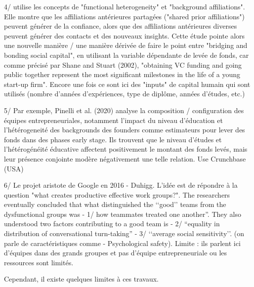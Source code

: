 \documentclass[12pt]{article}
\begin{document}
4/ \citep{beckman2007early} utilise les concepts de "functional heterogeneity" et "background affiliations". Elle montre que les affiliations antérieures partagées ("shared prior affiliations") peuvent générer de la confiance, alors que des affiliations antérieures diverses peuvent générer des contacts et des nouveaux insights. Cette étude pointe alors une nouvelle manière / une manière dérivée de faire le point entre "bridging and bonding social capital", en utilisant la variable dépendante de levée de fonds, car comme précisé par Shane and Stuart (2002), "obtaining VC funding and going public together represent the most significant milestones in the life of a young start-up firm". Encore une fois ce sont ici des "inputs" de capital humain qui sont utilisés (nombre d'années d'expériences, type de diplôme, années d'études, etc.)

5/ Par exemple, Pinelli et al. (2020) analyse la composition / configuration des équipes entrepreneuriales, notamment l'impact du niveau d'éducation et l'hétérogeneité des backgrounds des founders comme estimateurs pour lever des fonds dans des phases early stage. Ils trouvent que le niveau d'études et l'hétérogénéité éducative affectent positivement le montant des fonds levés, mais leur présence conjointe modère négativement une telle relation. Use Crunchbase (USA)

6/ Le projet aristote de Google en 2016 - Duhigg. L'idée est de répondre à la question "what creates productive effective work groups?". The researchers eventually concluded that what distinguished the ‘‘good’’ teams from the dysfunctional groups was -	1/ how teammates treated one another”. They also understood two factors contributing to a good team is -	2/ “equality in distribution of conversational turn-taking” -	3/ ‘‘average social sensitivity’’. (on parle de caractéristiques comme -	Psychological safety). Limite : ils parlent ici d'équipes dans des grands groupes et pas d'équipe entrepreneuriale ou les ressources sont limités.

Cependant, il existe quelques limites à ces travaux.
\end{document}
